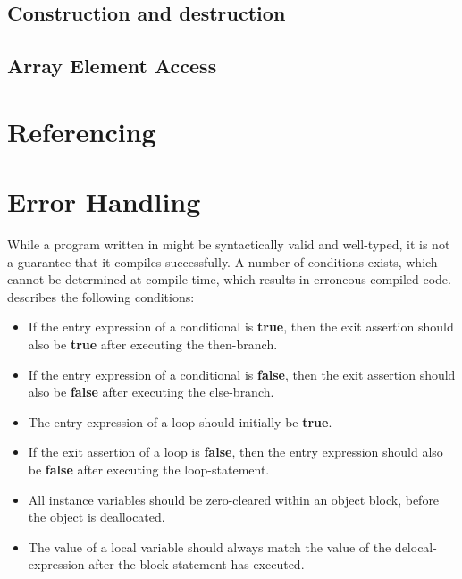 \subsection{Construction and destruction}
\label{subsec:construction-destruction}

\subsection{Array Element Access}
\label{subsec:array-element-access}

\section{Referencing}
\label{sec:referencing}

\section{Error Handling}
\label{sec:error-handling}

While a program written in \rooplpp might be syntactically valid and well-typed, it is not a guarantee that it compiles successfully. A number of conditions exists, which cannot be determined at compile time, which results in erroneous compiled code. \citeauthor{th:roopl} describes the following conditions:

\begin{itemize}
    \item If the entry expression of a conditional is \textbf{true}, then the exit assertion should also be \textbf{true} after executing the then-branch.
    \item If the entry expression of a conditional is \textbf{false}, then the exit assertion should also be \textbf{false} after executing the else-branch.
    \item The entry expression of a loop should initially be \textbf{true}.
    \item If the exit assertion of a loop is \textbf{false}, then the entry expression should also be \textbf{false} after executing the loop-statement.
    \item All instance variables should be zero-cleared within an object block, before the object is deallocated.
    \item The value of a local variable should always match the value of the delocal-expression after the block statement has executed.
\end{itemize}

